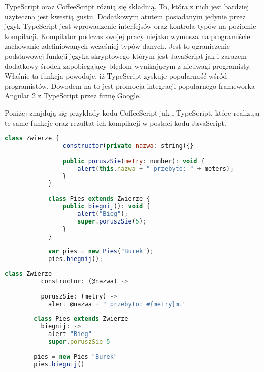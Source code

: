 TypeScript oraz CoffeeScript różnią się składnią. To, która z nich jest bardziej użyteczna jest kwestią gustu. Dodatkowym atutem posiadanym jedynie przez język TypeScript jest wprowadzenie interfejsów oraz kontrola typów na poziomie kompilacji. Kompilator podczas swojej pracy niejako wymusza na programiście zachowanie zdefiniowanych wcześniej typów danych. Jest to ograniczenie podstawowej funkcji języka skryptowego którym jest JavaScript jak i zarazem dodatkowy środek zapobiegający błędom wynikającym z nieuwagi programisty. Właśnie ta funkcja powoduje, iż TypeScript zyskuje popularność wśród programistów. Dowodem na to jest promocja integracji popularnego frameworka Angular 2 z TypeScript przez firmę Google\cite{angular2-site}.

Poniżej znajdują się przykłady kodu CoffeeScript jak i TypeScript, które realizują te same funkcje oraz rezultat ich kompilacji w postaci kodu JavaScript. 
 
\begin{minipage}[t]{.50\linewidth}
\begin{lstlisting}[language=JavaScript,basicstyle=\small,frame=top,title={Kod TypeScript}]
			class Zwierze {
			    constructor(private nazwa: string){}
			    
				public poruszSie(metry: number): void {
					alert(this.nazwa + " przebyto: " + meters);
				}
			}
			
			class Pies extends Zwierze {
				public biegnij(): void {
					alert("Bieg");
					super.poruszSie(5);
				}
			}
			
			var pies = new Pies("Burek");
			pies.biegnij();
		\end{lstlisting}
\end{minipage} 
\begin{minipage}[t]{.50\linewidth}
\begin{lstlisting}[language=JavaScript,basicstyle=\small,frame=top,title={Kod CoffeeScript}]
		class Zwierze
		  constructor: (@nazwa) ->
		
		  poruszSie: (metry) ->
		    alert @nazwa + " przebyto: #{metry}m."
		
		class Pies extends Zwierze
		  biegnij: ->
		    alert "Bieg"
		    super.poruszSie 5
		    
		pies = new Pies "Burek"
		pies.biegnij()
		 
\end{lstlisting}
\end{minipage}

